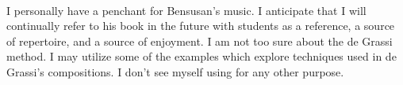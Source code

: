 \documentclass[12pt]{article}
\begin{document}
\strut\\
I personally have a penchant for Bensusan's music. I anticipate that I will continually refer to his book in the future with students as a reference, a source of repertoire, and a source of enjoyment. I am not too sure about the de Grassi method. I may utilize some of the examples which explore techniques used in de Grassi's compositions. I don't see myself using for any other purpose.
\end{document}
